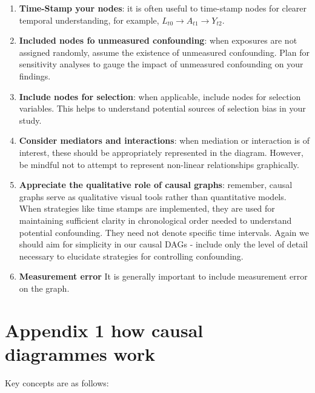\documentclass[
  singlecolumn]{report}
\begin{document}
\begin{enumerate}
\def\labelenumi{\arabic{enumi}.}
\setcounter{enumi}{4}
\item
  \textbf{Time-Stamp your nodes}: it is often useful to time-stamp nodes
  for clearer temporal understanding, for example,
  \(L_{t0} \rightarrow A_{t1} \rightarrow Y_{t2}\).
\item
  \textbf{Included nodes fo unmeasured confounding}: when exposures are
  not assigned randomly, assume the existence of unmeasured confounding.
  Plan for sensitivity analyses to gauge the impact of unmeasured
  confounding on your findings.
\item
  \textbf{Include nodes for selection}: when applicable, include nodes
  for selection variables. This helps to understand potential sources of
  selection bias in your study.
\item
  \textbf{Consider mediators and interactions}: when mediation or
  interaction is of interest, these should be appropriately represented
  in the diagram. However, be mindful not to attempt to represent
  non-linear relationships graphically.
\item
  \textbf{Appreciate the qualitative role of causal graphs}: remember,
  causal graphs serve as qualitative visual tools rather than
  quantitative models. When strategies like time stamps are implemented,
  they are used for maintaining sufficient clarity in chronological
  order needed to understand potential confounding. They need not denote
  specific time intervals. Again we should aim for simplicity in our
  causal DAGs - include only the level of detail necessary to elucidate
  strategies for controlling confounding.
\item
  \textbf{Measurement error} It is generally important to include
  measurement error on the graph.
\end{enumerate}

\hypertarget{appendix-1-how-causal-diagrammes-work}{%
\section{Appendix 1 how causal diagrammes
work}\label{appendix-1-how-causal-diagrammes-work}}

Key concepts are as follows:
\end{document}
